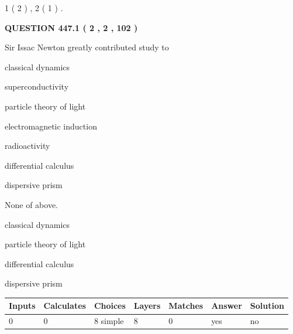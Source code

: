 \documentclass[12pt]{article}
\begin{document}
   
   1 ( 2 )
 ,
   2 ( 1 )
 .
  
\vspace{0.2in}
  
{\textbf{\Large{QUESTION
447.1 
 ( 2 , 2 , 102 )
}}}
  
  
Sir Issac Newton greatly contributed study to
 
 
classical dynamics
 
 
superconductivity
 
 
particle theory of light
 
 
electromagnetic induction
 
 
radioactivity
 
 
differential calculus
 
 
dispersive prism
 
 
 None of above.
 
 
\noindent{}
 
 
classical dynamics
 
 
particle theory of light
 
 
differential calculus
 
 
dispersive prism
 
 
\noindent{}
 
 
   
   
   
   
\noindent\begin{tabular}{|l|l|l|l|l|l|l|}
 \hline
Inputs & Calculates & Choices & Layers & Matches & Answer & Solution \\ \hline
 0  & 
 0  & 
 8
  simple  
  & 
 8  & 
 0  & 
  yes & 
  no 
  \\ \hline
 \end{tabular}
   
   
   
   
\noindent{}
   
   
   
\end{document}
